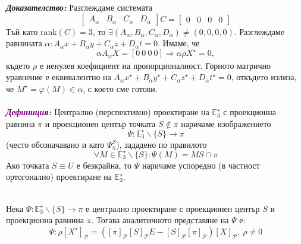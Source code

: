 \documentclass[12pt]{article}
\begin{document}
\textbf{\textit{Доказателство:}} Разглеждаме системата $$\begin{bmatrix}A_\alpha & B_\alpha & C_\alpha & D_\alpha\end{bmatrix} C = \begin{bmatrix}0 & 0 & 0 & 0\end{bmatrix}$$ Тъй като $\mathrm{rank}(C)=3$, то $\exists(A_\alpha,B_\alpha,C_\alpha,D_\alpha)\neq(0,0,0,0)$. Разглеждаме равнината $\alpha:A_\alpha x+B_\alpha y+C_\alpha z+D_\alpha t=0$. Имаме, че $$\alpha A_{\varphi} X=[0\ 0\ 0\ 0]\Rightarrow\alpha\rho X^\star=0, $$ където $\rho$ е ненулев коефициент на пропорционалност.
Горното матрично уравнение е еквивалентно на $A_\alpha x^\star+B_\alpha y^\star+C_\alpha z^\star+D_\alpha t^\star=0$, откъдето излиза, че $M^\star=\varphi(M)\in\alpha$, с което сме готови.
\\
\\
\textbf{\textit{\textcolor{purple}{Дефиниция:}}} Централно (перспективно) проектиране на $\mathbb{E}_3^{\star}$ с проекционна равнина $\pi$ и проекционен център точката $S\not\in\pi$ наричаме изображението $$\Psi:\mathbb{E}_3^{\star}\backslash\lbrace S\rbrace \to \pi$$ (често обозначавано и като $\Psi_{\pi}^S$), зададено по правилото $$\forall M\in\mathbb{E}_3^\star\backslash \{S\}:\Psi(M)=MS\cap\pi$$
Ако точката $S\equiv U$ е безкрайна, то $\Psi$ наричаме успоредно (в частност ортогонално) проектиране на $\mathbb{E}_3^{\star}$.
\\
\\
\begin{tcolorbox}[
    colback=blue!5,    %
    colframe=blue!75!black, %
    title={\textbf{Твърдение 12:}}, %
    fonttitle=\bfseries,
    boxrule=0.8pt,
    arc=1mm,           %
    top=2mm, bottom=2mm, left=3mm, right=3mm
] Нека $\Psi:\mathbb{E}_3^\star\backslash\{S\}\to\pi$ е централно проектиране с проекционен център $S$ и проекционна равнина $\pi$. Тогава аналитичното представяне на $\Psi$ е: $$\Psi:\rho [X^\star]_{\mathcal P}=\left([\pi]_{\mathscr P} [S]_{\mathcal P}E-[S]_{\mathcal P}[\pi]_{\mathscr P}\right)[X]_{\mathcal P},\ \rho\neq0$$
\end{tcolorbox}
\end{document}
